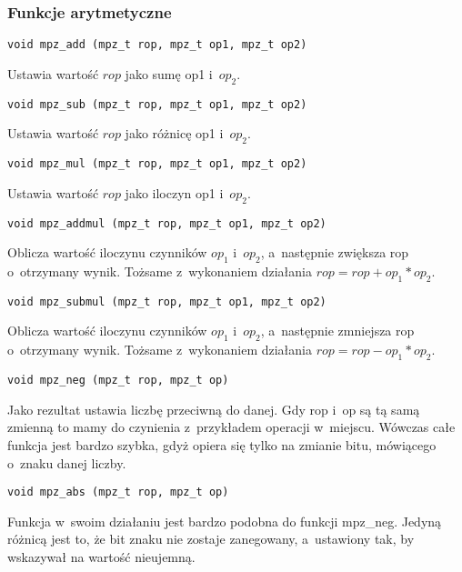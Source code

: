 \subsubsection{Funkcje arytmetyczne}

\begin{lstlisting}
void mpz_add (mpz_t rop, mpz_t op1, mpz_t op2)
\end{lstlisting}

Ustawia wartość $rop$ jako sumę op1 i~$op_2$.

\begin{lstlisting}
void mpz_sub (mpz_t rop, mpz_t op1, mpz_t op2)
\end{lstlisting}

Ustawia wartość $rop$ jako różnicę op1 i~$op_2$.

\begin{lstlisting}
void mpz_mul (mpz_t rop, mpz_t op1, mpz_t op2)
\end{lstlisting}

Ustawia wartość $rop$ jako iloczyn op1 i~$op_2$.

\begin{lstlisting}
void mpz_addmul (mpz_t rop, mpz_t op1, mpz_t op2)
\end{lstlisting}

Oblicza wartość iloczynu czynników $op_1$ i~$op_2$, a~następnie zwiększa rop o~otrzymany wynik. Tożsame z~wykonaniem działania $rop = rop + op_1 * op_2$.

\begin{lstlisting}
void mpz_submul (mpz_t rop, mpz_t op1, mpz_t op2)
\end{lstlisting}

Oblicza wartość iloczynu czynników $op_1$ i~$op_2$, a~następnie zmniejsza rop o~otrzymany wynik. Tożsame z~wykonaniem działania $rop = rop - op_1 * op_2$.

\begin{lstlisting}
void mpz_neg (mpz_t rop, mpz_t op)
\end{lstlisting}

Jako rezultat ustawia liczbę przeciwną do danej. Gdy rop i~op są tą samą zmienną to mamy do czynienia z~przykładem operacji w~miejscu. Wówczas całe funkcja jest bardzo szybka, gdyż opiera się tylko na zmianie bitu, mówiącego o~znaku danej liczby.

\begin{lstlisting}
void mpz_abs (mpz_t rop, mpz_t op)
\end{lstlisting}

Funkcja w~swoim działaniu jest bardzo podobna do funkcji mpz\_neg. Jedyną różnicą jest to, że bit znaku nie zostaje zanegowany, a~ustawiony tak, by wskazywał na wartość nieujemną.

